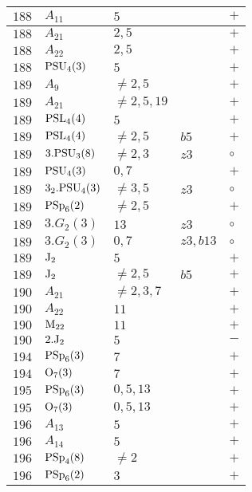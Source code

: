 \documentclass[a4paper, 11pt]{article}
\begin{document}
\begin{longtable}{lllll}
		$188$ & $A_{11}$ & $5$ &  & $+$ \\ \hline
		$188$ & $A_{21}$ & $2,5$ &  & $+$ \\ \hline
		$188$ & $A_{22}$ & $2,5$ &  & $+$ \\ \hline
		$188$ & ${\rm PSU}_{4}(3)$ & $5$ &  & $+$ \\ \hline
		$189$ & $A_{9}$ & $\neq 2,5$ &  & $+$ \\ \hline
		$189$ & $A_{21}$ & $\neq 2,5,19$ &  & $+$ \\ \hline
		$189$ & ${\rm PSL}_{4}(4)$ & $5$ &  & $+$ \\ \hline
		$189$ & ${\rm PSL}_{4}(4)$ & $\neq 2,5$ & $b5$ & $+$ \\ \hline
		$189$ & $3.{\rm PSU}_{3}(8)$ & $\neq 2,3$ & $z3$ & $\circ$ \\ \hline
		$189$ & ${\rm PSU}_{4}(3)$ & $0,7$ &  & $+$ \\ \hline
		$189$ & $3_2.{\rm PSU}_{4}(3)$ & $\neq 3,5$ & $z3$ & $\circ$ \\ \hline
		$189$ & ${\rm PSp}_{6}(2)$ & $\neq 2,5$ &  & $+$ \\ \hline
		$189$ & $3.G_{2}(3)$ & $13$ & $z3$ & $\circ$ \\ \hline
		$189$ & $3.G_{2}(3)$ & $0,7$ & $z3,b13$ & $\circ$ \\ \hline
		$189$ & ${\rm J}_2$ & $5$ &  & $+$ \\ \hline
		$189$ & ${\rm J}_2$ & $\neq 2,5$ & $b5$ & $+$ \\ \hline
		$190$ & $A_{21}$ & $\neq 2,3,7$ &  & $+$ \\ \hline
		$190$ & $A_{22}$ & $11$ &  & $+$ \\ \hline
		$190$ & ${\rm M}_{22}$ & $11$ &  & $+$ \\ \hline
		$190$ & $2.{\rm J}_2$ & $5$ &  & $-$ \\ \hline
		$194$ & ${\rm PSp}_{6}(3)$ & $7$ &  & $+$ \\ \hline
		$194$ & ${\rm O}_{7}(3)$ & $7$ &  & $+$ \\ \hline
		$195$ & ${\rm PSp}_{6}(3)$ & $0,5,13$ &  & $+$ \\ \hline
		$195$ & ${\rm O}_{7}(3)$ & $0, 5, 13$ &  & $+$ \\ \hline
		$196$ & $A_{13}$ & $5$ &  & $+$ \\ \hline
		$196$ & $A_{14}$ & $5$ &  & $+$ \\ \hline
		$196$ & ${\rm PSp}_{4}(8)$ & $\neq 2$ &  & $+$ \\ \hline
		$196$ & ${\rm PSp}_{6}(2)$ & $3$ &  & $+$ \\ \hline

\end{longtable}
\end{document}
